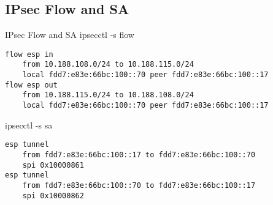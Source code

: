 \documentclass[14pt]{beamer}
\begin{document}
\subsection{IPsec Flow and SA}
\begin{frame}[fragile]{IPsec Flow and SA}
ipsecctl -s flow
\scriptsize
\begin{verbatim}
flow esp in
    from 10.188.108.0/24 to 10.188.115.0/24
    local fdd7:e83e:66bc:100::70 peer fdd7:e83e:66bc:100::17
flow esp out
    from 10.188.115.0/24 to 10.188.108.0/24
    local fdd7:e83e:66bc:100::70 peer fdd7:e83e:66bc:100::17
\end{verbatim}
\normalsize
ipsecctl -s sa
\scriptsize
\begin{verbatim}
esp tunnel
    from fdd7:e83e:66bc:100::17 to fdd7:e83e:66bc:100::70
    spi 0x10000861
esp tunnel
    from fdd7:e83e:66bc:100::70 to fdd7:e83e:66bc:100::17
    spi 0x10000862
\end{verbatim}
\end{frame}
\end{document}
